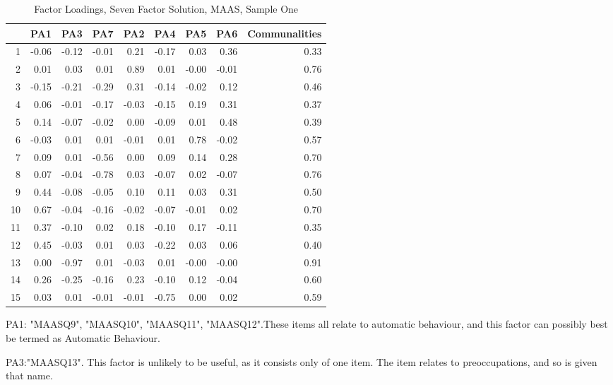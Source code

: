\documentclass{article}
\begin{document}
\begin{table}[ht]
\centering
\begin{tabular}{rrrrrrrrr}
  \hline
 & PA1 & PA3 & PA7 & PA2 & PA4 & PA5 & PA6 & Communalities \\ 
  \hline
1 & -0.06 & -0.12 & -0.01 & 0.21 & -0.17 & 0.03 & 0.36 & 0.33 \\ 
  2 & 0.01 & 0.03 & 0.01 & 0.89 & 0.01 & -0.00 & -0.01 & 0.76 \\ 
  3 & -0.15 & -0.21 & -0.29 & 0.31 & -0.14 & -0.02 & 0.12 & 0.46 \\ 
  4 & 0.06 & -0.01 & -0.17 & -0.03 & -0.15 & 0.19 & 0.31 & 0.37 \\ 
  5 & 0.14 & -0.07 & -0.02 & 0.00 & -0.09 & 0.01 & 0.48 & 0.39 \\ 
  6 & -0.03 & 0.01 & 0.01 & -0.01 & 0.01 & 0.78 & -0.02 & 0.57 \\ 
  7 & 0.09 & 0.01 & -0.56 & 0.00 & 0.09 & 0.14 & 0.28 & 0.70 \\ 
  8 & 0.07 & -0.04 & -0.78 & 0.03 & -0.07 & 0.02 & -0.07 & 0.76 \\ 
  9 & 0.44 & -0.08 & -0.05 & 0.10 & 0.11 & 0.03 & 0.31 & 0.50 \\ 
  10 & 0.67 & -0.04 & -0.16 & -0.02 & -0.07 & -0.01 & 0.02 & 0.70 \\ 
  11 & 0.37 & -0.10 & 0.02 & 0.18 & -0.10 & 0.17 & -0.11 & 0.35 \\ 
  12 & 0.45 & -0.03 & 0.01 & 0.03 & -0.22 & 0.03 & 0.06 & 0.40 \\ 
  13 & 0.00 & -0.97 & 0.01 & -0.03 & 0.01 & -0.00 & -0.00 & 0.91 \\ 
  14 & 0.26 & -0.25 & -0.16 & 0.23 & -0.10 & 0.12 & -0.04 & 0.60 \\ 
  15 & 0.03 & 0.01 & -0.01 & -0.01 & -0.75 & 0.00 & 0.02 & 0.59 \\ 
   \hline
\end{tabular}
\caption{Factor Loadings, Seven Factor Solution, MAAS, Sample One} 
\label{tab:tcq1maas7fact}
\end{table}


PA1: "MAASQ9",  "MAASQ10", "MAASQ11", "MAASQ12".These items all relate to automatic behaviour, and this factor can possibly best be termed as Automatic Behaviour.

PA3:"MAASQ13". This factor is unlikely to be useful, as it consists only of one item. The item relates to preoccupations, and so is given that name. 
\end{document}
